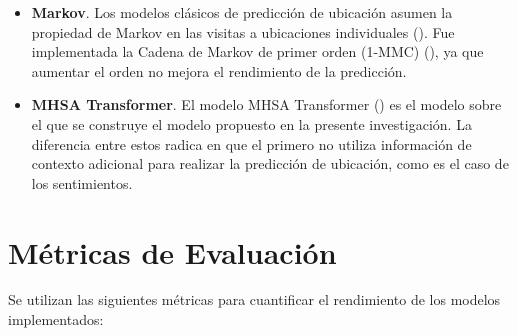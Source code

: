 \begin{itemize}
    \item \textbf{Markov}. Los modelos cl\'asicos de predicci\'on de 
    ubicaci\'on asumen la propiedad de Markov en las visitas a ubicaciones 
    individuales (\cite{ashbrook2002learning}). Fue implementada la Cadena de Markov de 
    primer orden (1-MMC) (\cite{gambs2012next}), ya que aumentar el orden no 
    mejora el rendimiento de la predicci\'on.
    \item \textbf{MHSA Transformer}. El modelo MHSA Transformer (\cite{Hong_2023}) es el 
    modelo sobre el que se construye el modelo propuesto en la
    presente investigación. 
    La diferencia entre estos 
    radica en que el primero no utiliza informaci\'on de contexto adicional
    para realizar la predicci\'on de 
    ubicaci\'on, como es el caso de los sentimientos.
\end{itemize}

\section{M\'etricas de Evaluaci\'on}

Se utilizan las siguientes m\'etricas para cuantificar el rendimiento de 
los modelos implementados:

